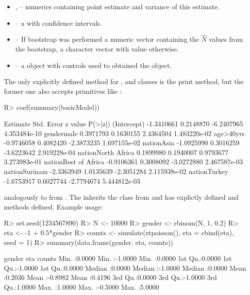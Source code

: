 \documentclass[
]{jss}
\newcommand{\1}{\mathcal{I}} \newcommand{\bZero}{\boldsymbol{0}}
\begin{document}
\begin{itemize}
  \item {},  -- numerics containing point estimate and variance of this estimate.
  \item {} -- a  with confidence intervals.
  \item {} -- If bootstrap was performed a numeric vector containing the $\hat{N}$ values from the bootstrap, 
  a character vector with value  otherwise.
  \item {} -- a  object with controls used to obtained the object.
\end{itemize}

The only explicitly defined method for ,
 and 
classes is the print method, but the former one also accepts
 primitives like :

\begin{CodeChunk}
\begin{CodeInput}
R> coef(summary(basicModel))
\end{CodeInput}
\begin{CodeOutput}
                       Estimate Std. Error    z value      P(>|z|)
(Intercept)          -1.3410661  0.2148870 -6.2407965 4.353484e-10
gendermale            0.3971793  0.1630155  2.4364504 1.483220e-02
age>40yrs            -0.9746058  0.4082420 -2.3873235 1.697155e-02
nationAsia           -1.0925990  0.3016259 -3.6223642 2.919228e-04
nationNorth Africa    0.1899980  0.1940007  0.9793677 3.273983e-01
nationRest of Africa -0.9106361  0.3008092 -3.0272880 2.467587e-03
nationSurinam        -2.3363949  1.0135639 -2.3051284 2.115938e-02
nationTurkey         -1.6753917  0.6027744 -2.7794674 5.444812e-03
\end{CodeOutput}
\end{CodeChunk}

analogously to  from . The 
inherits the  class from  and has explictly
defined  and  methods defined. Example usage:

\begin{CodeChunk}
\begin{CodeInput}
R> set.seed(1234567890)
R> N <- 10000
R> gender <- rbinom(N, 1, 0.2)
R> eta <- -1 + 0.5*gender
R> counts <- simulate(ztpoisson(), eta = cbind(eta), seed = 1)
R> summary(data.frame(gender, eta, counts))
\end{CodeInput}
\begin{CodeOutput}
     gender            eta              counts      
 Min.   :0.0000   Min.   :-1.0000   Min.   :0.0000  
 1st Qu.:0.0000   1st Qu.:-1.0000   1st Qu.:0.0000  
 Median :0.0000   Median :-1.0000   Median :0.0000  
 Mean   :0.2036   Mean   :-0.8982   Mean   :0.4196  
 3rd Qu.:0.0000   3rd Qu.:-1.0000   3rd Qu.:1.0000  
 Max.   :1.0000   Max.   :-0.5000   Max.   :5.0000  
\end{CodeOutput}
\end{CodeChunk}
\end{document}
